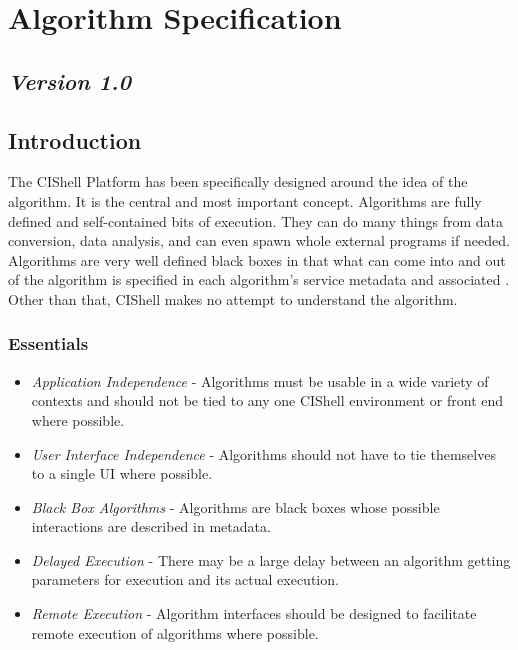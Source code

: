 %

\section{Algorithm Specification}

\subsection*{\textit{Version 1.0}}

\subsection{Introduction}

The CIShell Platform has been specifically designed around the idea of the
algorithm. It is the central and most important concept. Algorithms are fully
defined and self-contained bits of execution. They can do many things from data
conversion, data analysis, and can even spawn whole external programs if needed.
Algorithms are very well defined black boxes in that what can come into and out
of the algorithm is specified in each algorithm's service metadata and
associated . Other than that, CIShell makes no attempt
to understand the algorithm.

\subsubsection{Essentials}
\begin{itemize}
  \item \textit{Application Independence} - Algorithms must be usable in a wide
  variety of contexts and should not be tied to any one CIShell environment or
  front end where possible.
  \item \textit{User Interface Independence} - Algorithms should not have to tie
  themselves to a single UI where possible.
  \item \textit{Black Box Algorithms} - Algorithms are black boxes whose
  possible interactions are described in metadata.
  \item \textit{Delayed Execution} - There may be a large delay between an
  algorithm getting parameters for execution and its actual execution.
  \item \textit{Remote Execution} - Algorithm interfaces should be designed to
  facilitate remote execution of algorithms where possible.
\end{itemize}

